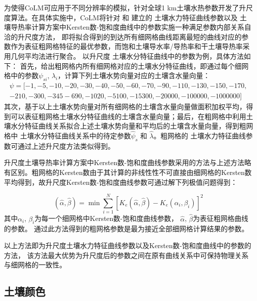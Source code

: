 为使得CoLM可应用于不同分辨率的模拟，针对全球1 km土壤水热参数开发了升尺度算法。在具体实施中，CoLM将针对 \citet{campbell1974} 和 \citet{van1980closed} 建立的
土壤水力特征曲线参数以及 \citet{balland2005} 土壤导热率计算方案中Kersten数-饱和度曲线中的参数实施一种满足参数内部关系自洽的升尺度方法，
即将拟合得到的到达所有细网格曲线距离最短的曲线对应的参数作为表征粗网格特征的最优参数，而饱和土壤导水率/导热率和干土壤导热率采用几何平均法进行聚合。
以升尺度 \citet{campbell1974} 土壤水分特征曲线中的参数为例，具体方法如下：
首先，给出粗网格内所有细网格对应的土壤水分特征曲线，即通过每个细网格中的参数$\psi_{s i}$, $\lambda_{i}$，计算下列土壤水势向量对应的土壤含水量向量：
\begin{equation}
\begin{array}{l}\psi=[-1,-5,-10,-20,-30,-40,-50,-60,-70,-90,-110,-130,-150,-170,\\-210,-300,-345  -690,-1020,-5100,-15300,-20000,-100000,-1000000]\end{array}
\end{equation}
其次，基于以上土壤水势向量对所有细网格的土壤含水量向量做面积加权平均，得到可以表征粗网格土壤水分特征曲线的土壤含水量向量；最后，在粗网格中利用\citet{campbell1974}土壤水分特征曲线关系拟合上述土壤水势向量和平均后的土壤含水量向量，得到粗网格中 \citet{campbell1974} 土壤水分特征曲线关系中的待定参数$\hat{\psi}_{s}$ 和 $\hat{\lambda}$。粗网格的\citet{van1980closed} 土壤水力特征曲线参数可通过上述升尺度方法类似得到。


升尺度土壤导热率计算方案中Kersten数-饱和度曲线参数采用的方法与上述方法略有区别。粗网格的Kersten数由于其计算的非线性性不可直接由细网格的Kersten数平均得到，故升尺度Kersten数-饱和度曲线参数可通过解下列极值问题得到：

\begin{equation}
(\hat{\alpha}, \hat{\beta})=\min \sum_{i=1}^{N}\left[K_{e}(\hat{\alpha}, \hat{\beta})-K_{e}\left(\alpha_{i}, \beta_{i}\right)\right]^{2}
\end{equation}
其中$\alpha_{i}$,  $\beta_{i}$为每一个细网格中Kersten数-饱和度曲线参数，
$\hat{\alpha}$, $\hat{\beta}$为表征粗网格曲线的参数。
通过此方法得到的粗网格参数是最为接近全部细网格计算结果的参数。


以上方法即为升尺度土壤水力特征曲线参数以及Kersten数-饱和度曲线中的参数的方法，
该方法最大优势为升尺度后的参数之间在原有曲线关系中可保持物理关系与细网格的一致性。
\subsection{土壤颜色}\label{土壤颜色}

